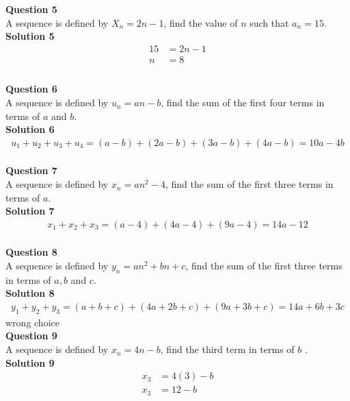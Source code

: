 \documentclass{article}
\begin{document}
\noindent\textbf{Question 5}\\[5pt]
A sequence is defined by $X_n=2n-1$, find the value of $n$ such that $a_n=15$.\\[5pt]
\noindent\textbf{Solution 5}\\[5pt]
\begin{align*}
15&=2n-1\\[2pt]
n&=8\\[10pt]
\end{align*}\\[10pt]

\noindent\textbf{Question 6}\\[5pt]
A sequence is defined by $u_n=an-b$, find the sum of the first four terms in terms of $a$ and $b$.\\[5pt]
\noindent\textbf{Solution 6}\\[5pt]
\begin{align*}
u_1+u_2+u_3+u_4=(a-b)+(2a-b)+(3a-b)+(4a-b)=10a-4b
\end{align*}\\[10pt]

\noindent\textbf{Question 7}\\[5pt]
A sequence is defined by $x_n=an^2-4$, find the sum of the first three terms in terms of $a$.\\[5pt]
\noindent\textbf{Solution 7}\\[5pt]
\begin{align*}
x_1+x_2+x_3=(a-4)+(4a-4)+(9a-4)=14a-12
\end{align*}\\[10pt]

\noindent\textbf{Question 8}\\[5pt]
A sequence is defined by $y_n=an^2+bn+c$, find the sum of the first three terms in terms of $a,b$ and $c$.\\[5pt]
\noindent\textbf{Solution 8}\\[5pt]
\begin{align*}
y_1+y_2+y_3=(a+b+c)+(4a+2b+c)+(9a+3b+c)=14a+6b+3c
\end{align*}
wrong choice\\[10pt]

\noindent\textbf{Question 9}\\[5pt]
A sequence is defined by $x_n=4n-b$, find the third term in terms of $b$ .\\[5pt]
\noindent\textbf{Solution 9}\\[5pt]
\begin{align*}
x_3&=4(3)-b\\
x_3&=12-b
\end{align*}\\[10pt]
\end{document}
